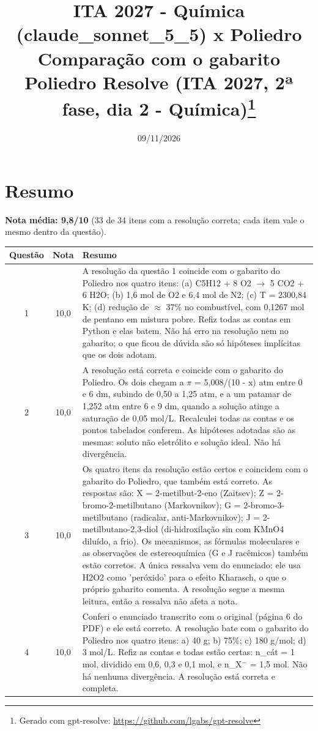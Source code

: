 \documentclass{article}%
\title{ITA 2027 {-} Química (claude\_sonnet\_5\_5) x Poliedro\\[4pt]\large Comparação com o gabarito Poliedro Resolve (ITA 2027, 2ª fase, dia 2 {-} Química)\thanks{Gerado com gpt-resolve: \url{https://github.com/lgabs/gpt-resolve}}}%
\date{09/11/2026}%
\begin{document}
%
\normalsize%
\maketitle%
\section*{Resumo}\textbf{Nota média: 9,8/10} (33 de 34 itens com a resolução correta; cada item vale o mesmo dentro da questão).\par\medskip%
\begin{longtable}{@{}c c p{}@{}}\toprule Questão & Nota & Resumo \\ \midrule
1 & 10,0 & A resolução da questão 1 coincide com o gabarito do Poliedro nos quatro itens: (a) C5H12 + 8 O2 $\to$ 5 CO2 + 6 H2O; (b) 1,6 mol de O2 e 6,4 mol de N2; (c) T = 2300,84 K; (d) redução de $\approx$ 37\% no combustível, com 0,1267 mol de pentano em mistura pobre. Refiz todas as contas em Python e elas batem. Não há erro na resolução nem no gabarito; o que ficou de dúvida são só hipóteses implícitas que os dois adotam. \\
2 & 10,0 & A resolução está correta e coincide com o gabarito do Poliedro. Os dois chegam a $\pi$ = 5,008/(10 - x) atm entre 0 e 6 dm, subindo de 0,50 a 1,25 atm, e a um patamar de 1,252 atm entre 6 e 9 dm, quando a solução atinge a saturação de 0,05 mol/L. Recalculei todas as contas e os pontos tabelados conferem. As hipóteses adotadas são as mesmas: soluto não eletrólito e solução ideal. Não há divergência. \\
3 & 10,0 & Os quatro itens da resolução estão certos e coincidem com o gabarito do Poliedro, que também está correto. As respostas são: X = 2{-}metilbut{-}2{-}eno (Zaitsev); Z = 2{-}bromo{-}2{-}metilbutano (Markovnikov); G = 2{-}bromo{-}3{-}metilbutano (radicalar, anti{-}Markovnikov); J = 2{-}metilbutano{-}2,3{-}diol (di{-}hidroxilação sin com KMnO4 diluído, a frio). Os mecanismos, as fórmulas moleculares e as observações de estereoquímica (G e J racêmicos) também estão corretos. A única ressalva vem do enunciado: ele usa H2O2 como 'peróxido' para o efeito Kharasch, o que o próprio gabarito comenta. A resolução segue a mesma leitura, então a ressalva não afeta a nota. \\
4 & 10,0 & Conferi o enunciado transcrito com o original (página 6 do PDF) e ele está correto. A resolução bate com o gabarito do Poliedro nos quatro itens: a) 40 g; b) 75\%; c) 180 g/mol; d) 3 mol/L. Refiz as contas e todas estão certas: n\_cát = 1 mol, dividido em 0,6, 0,3 e 0,1 mol, e n\_X$^{-}$ = 1,5 mol. Não há nenhuma divergência. A resolução está correta e completa. \\

\end{longtable}
\end{document}
